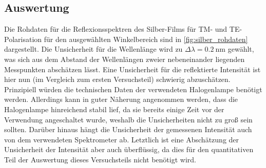 \subsection{Auswertung}\label{subsec:teil2_auswertung}
Die Rohdaten für die Reflexionsspektren des Silber-Films für TM- und TE- Polarisation für den ausgewählten Winkelbereich sind in \cref{fig:silber_rohdaten} dargestellt.
Die Unsicherheit für die Wellenlänge wird zu $\Delta \lambda = \SI{0,2}{\nm}$ gewählt, was sich aus dem Abstand der Wellenlängen zweier nebeneinander liegenden Messpunkten
abschätzen lässt. Eine Unsicherheit für die reflektierte Intensität ist hier nun (im Vergleich zum ersten Versuchsteil) schwierig abzuschätzen. Prinzipiell würden
die technischen Daten der verwendeten Halogenlampe benötigt werden. Allerdings kann in guter Näherung angenommen werden, dass die Halogenlampe hinreichend stabil lief,
da sie bereits einige Zeit vor der Verwendung angeschaltet wurde, weshalb die Unsicherheiten nicht zu groß sein sollten. Darüber hinaus hängt die Unsicherheit der
gemessenen Intensität auch von dem verwendeten Spektrometer ab. Letztlich ist eine Abschätzung der Unsicherheit der Intensität aber auch überflüssig, da dies für den
quantitativen Teil der Auswertung dieses Versuchsteils nicht benötigt wird.
